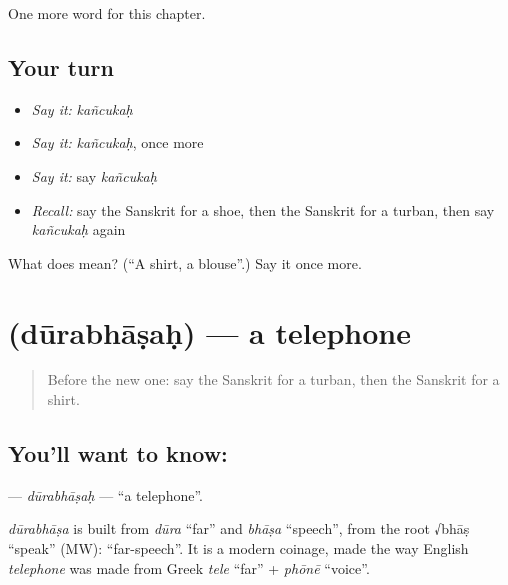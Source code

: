 \begin{grammarlens}[title={What you've built}]
One more word for this chapter.
\end{grammarlens}

\subsection*{Your turn}
\begin{itemize}
\raggedright
  \item \emph{Say it:} \emph{kañcukaḥ}
  \item \emph{Say it:} \emph{kañcukaḥ}, once more
  \item \emph{Say it:} say \emph{kañcukaḥ}
  \item \emph{Recall:} say the Sanskrit for a shoe, then the Sanskrit for a turban, then say \emph{kañcukaḥ} again
\end{itemize}

\begin{tcolorbox}[breakable,colback=teal!4,colframe=teal!35!black,title={Before you move on}]
What does  mean? (\textquotedblleft{}A shirt, a blouse\textquotedblright{}.) Say it once more.
\end{tcolorbox}
\section[\texorpdfstring{\sk{दूरभाषः} (dūrabhāṣaḥ)}{दूरभाषः (dūrabhāṣaḥ)}]{ (dūrabhāṣaḥ) — a telephone}

\label{lesson:SA-C104-durabhasah}



\begin{quote}
Before the new one: say the Sanskrit for a turban, then the Sanskrit for a shirt.
\end{quote}

\subsection*{You'll want to know: }
\textbf{} — \emph{dūrabhāṣaḥ} — \textquotedblleft{}a telephone\textquotedblright{}.

\begin{cousinweb}
\emph{dūrabhāṣa} is built from \emph{dūra} \textquotedblleft{}far\textquotedblright{} and \emph{bhāṣa} \textquotedblleft{}speech\textquotedblright{}, from the root √bhāṣ \textquotedblleft{}speak\textquotedblright{} (MW): \textquotedblleft{}far-speech\textquotedblright{}. It is a modern coinage, made the way English \emph{telephone} was made from Greek \emph{tele} \textquotedblleft{}far\textquotedblright{} + \emph{phōnē} \textquotedblleft{}voice\textquotedblright{}.
\end{cousinweb}

